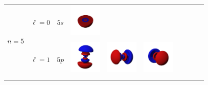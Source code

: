 \begin{landscape}
\begin{xltabular}{\linewidth}{C C C c c c c c c c}
& & &  &  &  &  &  &  &  \\ %

\midrule %

 &  &  & 
\centering
\includegraphics[width=1.6cm]{tableau_geometrie_orbitale_modelisation/S5M0.png} 
& & & & & & \\

& & &  & & & & & &  \\ %

\addlinespace

&  &  & 
\includegraphics[width=1.6cm]{tableau_geometrie_orbitale_modelisation/P5z.png} 
&
\includegraphics[width=1.6cm]{tableau_geometrie_orbitale_modelisation/P5x.png}  
&
\includegraphics[width=1.6cm]{tableau_geometrie_orbitale_modelisation/P5y.png} 
& & & & \\

& & &  &  &  & & & &  \\ %

\addlinespace


\end{xltabular}
\end{landscape}
